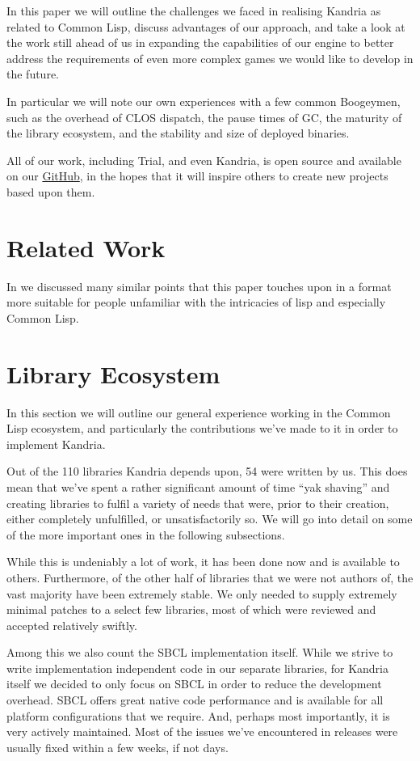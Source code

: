 \documentclass[format=sigconf]{acmart}
\begin{document}
In this paper we will outline the challenges we faced in realising Kandria as related to Common Lisp, discuss advantages of our approach, and take a look at the work still ahead of us in expanding the capabilities of our engine to better address the requirements of even more complex games we would like to develop in the future.

In particular we will note our own experiences with a few common Boogeymen, such as the overhead of CLOS dispatch, the pause times of GC, the maturity of the library ecosystem, and the stability and size of deployed binaries.

All of our work, including Trial, and even Kandria, is open source and available on our \href{https://github.com/shirakumo}{GitHub}, in the hopes that it will inspire others to create new projects based upon them.

\section{Related Work}\label{relatedwork}
In \cite{hafner2021} we discussed many similar points that this paper touches upon in a format more suitable for people unfamiliar with the intricacies of lisp and especially Common Lisp.

\section{Library Ecosystem}\label{yaks}
In this section we will outline our general experience working in the Common Lisp ecosystem, and particularly the contributions we've made to it in order to implement Kandria.

Out of the 110 libraries Kandria depends upon, 54 were written by us. This does mean that we've spent a rather significant amount of time ``yak shaving'' and creating libraries to fulfil a variety of needs that were, prior to their creation, either completely unfulfilled, or unsatisfactorily so. We will go into detail on some of the more important ones in the following subsections.

While this is undeniably a lot of work, it has been done now and is available to others. Furthermore, of the other half of libraries that we were not authors of, the vast majority have been extremely stable. We only needed to supply extremely minimal patches to a select few libraries, most of which were reviewed and accepted relatively swiftly.

Among this we also count the SBCL implementation itself. While we strive to write implementation independent code in our separate libraries, for Kandria itself we decided to only focus on SBCL in order to reduce the development overhead. SBCL offers great native code performance and is available for all platform configurations that we require. And, perhaps most importantly, it is very actively maintained. Most of the issues we've encountered in releases were usually fixed within a few weeks, if not days.
\end{document}
